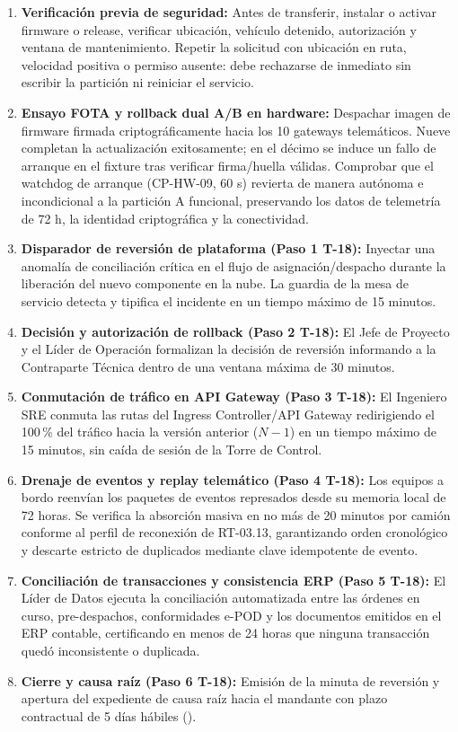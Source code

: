 \begin{enumerate}
\item \textbf{Verificación previa de seguridad:} Antes de transferir, instalar o activar firmware o release, verificar ubicación, vehículo detenido, autorización y ventana de mantenimiento. Repetir la solicitud con ubicación en ruta, velocidad positiva o permiso ausente: debe rechazarse de inmediato sin escribir la partición ni reiniciar el servicio.
\item \textbf{Ensayo FOTA y rollback dual A/B en hardware:} Despachar imagen de firmware firmada criptográficamente hacia los 10 gateways telemáticos. Nueve completan la actualización exitosamente; en el décimo se induce un fallo de arranque en el fixture tras verificar firma/huella válidas. Comprobar que el watchdog de arranque (CP-HW-09, 60 s) revierta de manera autónoma e incondicional a la partición A funcional, preservando los datos de telemetría de 72 h, la identidad criptográfica y la conectividad.
\item \textbf{Disparador de reversión de plataforma (Paso 1 T-18):} Inyectar una anomalía de conciliación crítica en el flujo de asignación/despacho durante la liberación del nuevo componente en la nube. La guardia de la mesa de servicio detecta y tipifica el incidente en un tiempo máximo de 15 minutos.
\item \textbf{Decisión y autorización de rollback (Paso 2 T-18):} El Jefe de Proyecto y el Líder de Operación formalizan la decisión de reversión informando a la Contraparte Técnica dentro de una ventana máxima de 30 minutos.
\item \textbf{Conmutación de tráfico en API Gateway (Paso 3 T-18):} El Ingeniero SRE conmuta las rutas del Ingress Controller/API Gateway redirigiendo el 100\,\% del tráfico hacia la versión anterior ($N-1$) en un tiempo máximo de 15 minutos, sin caída de sesión de la Torre de Control.
\item \textbf{Drenaje de eventos y replay telemático (Paso 4 T-18):} Los equipos a bordo reenvían los paquetes de eventos represados desde su memoria local de 72 horas. Se verifica la absorción masiva en no más de 20 minutos por camión conforme al perfil de reconexión de RT-03.13, garantizando orden cronológico y descarte estricto de duplicados mediante clave idempotente de evento.
\item \textbf{Conciliación de transacciones y consistencia ERP (Paso 5 T-18):} El Líder de Datos ejecuta la conciliación automatizada entre las órdenes en curso, pre-despachos, conformidades e-POD y los documentos emitidos en el ERP contable, certificando en menos de 24 horas que ninguna transacción quedó inconsistente o duplicada.
\item \textbf{Cierre y causa raíz (Paso 6 T-18):} Emisión de la minuta de reversión y apertura del expediente de causa raíz hacia el mandante con plazo contractual de 5 días hábiles ().
\end{enumerate}

